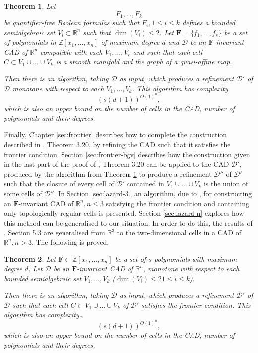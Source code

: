 \documentclass[
]{book}
\newtheorem{theorem}{Theorem}[chapter]
\theoremstyle{definition}
\theoremstyle{definition}
\theoremstyle{definition}
\theoremstyle{definition}
\theoremstyle{remark}
\begin{document}
\begin{theorem}
\protect\hypertarget{thm:bgv-monotone-algorithm}{}\label{thm:bgv-monotone-algorithm}Let
\[
F_1,\ldots,F_k
\]
be quantifier-free Boolean formulas such that \(F_i, 1\le i \le k\) defines a bounded semialgebraic set \(V_i \subset \mathbb{R}^n\) such that \(\dim(V_i) \le 2\).
Let \(\mathbf{F} = \{f_1,\ldots,f_s\}\) be a set of polynomials in \(\mathbb{Z}[x_1,\ldots,x_n]\) of maximum degree \(d\) and \(\mathcal{D}\) be an \(\mathbf{F}\)-invariant CAD of \(\mathbb{R}^n\) compatible with each \(V_1,\ldots,V_k\) and such that each cell \(C \subset V_1\cup\ldots\cup V_k\) is a smooth manifold and the graph of a quasi-affine map.

Then there is an algorithm, taking \(\mathcal{D}\) as input, which produces a refinement \(\mathcal{D'}\) of \(\mathcal{D}\) monotone with respect to each \(V_1, \ldots, V_k\).
This algorithm has complexity
\[
\left(s\left(d+1\right)\right)^{O(1)^n},
\]
which is also an upper bound on the number of cells in the CAD, number of polynomials and their degrees.
\end{theorem}

Finally, Chapter \ref{sec:frontier} describes how to complete the construction described in \citet{bgv15}, Theorem 3.20, by refining the CAD such that it satisfies the frontier condition. Section \ref{sec:frontier-bgv} describes how the construction given in the last part of the proof of \citet{bgv15}, Theorem 3.20 can be applied to the CAD \(\mathcal{D'}\), produced by the algorithm from Theorem \ref{thm:bgv-monotone-algorithm} to produce a refinement \(\mathcal{D''}\) of \(\mathcal{D'}\) such that the closure of every cell of \(\mathcal{D'}\) contained in \(V_1\cup \ldots \cup V_k\) is the union of some cells of \(\mathcal{D''}\).
In Section \ref{sec:lazard-3}, an algorithm, due to \citet{lazard10}, for constructing an \(\mathbf{F}\)-invariant CAD of \(\mathbb{R}^n, n \le 3\) satisfying the frontier condition and containing only topologically regular cells is presented. Section \ref{sec:lazard-n} explores how this method can be generalised to our situation. In order to do this, the results of \citet{lazard10}, Section 5.3 are generalised from \(\mathbb{R}^3\) to the two-dimensional cells in a CAD of \(\mathbb{R}^n, n > 3\).
The following is proved.

\begin{theorem}
\protect\hypertarget{thm:lazard-rn}{}\label{thm:lazard-rn}Let \(\mathbf{F} \subset \mathbb{Z}[x_1,\ldots,x_n]\) be a set of \(s\) polynomials with maximum degree \(d\).
Let \(\mathcal{D}\) be an \(\mathbf{F}\)-invariant CAD of \(\mathbb{R}^n\), monotone with respect to each bounded semialgebraic set \(V_1,\ldots,V_k\) (\(\dim(V_i) \le 2 1\le i \le k\)).

Then there is an algorithm, taking \(\mathcal{D}\) as input, which produces a refinement \(\mathcal{D'}\) of \(\mathcal{D}\) such that each cell \(C \subset V_1\cup\ldots\cup V_k\) of \(\mathcal{D'}\) satisfies the frontier condition.
This algorithm has complexity\ldots{}
\[
\left(s\left(d+1\right)\right)^{O(1)^n},
\]
which is also an upper bound on the number of cells in the CAD, number of polynomials and their degrees.
\end{theorem}
\end{document}
